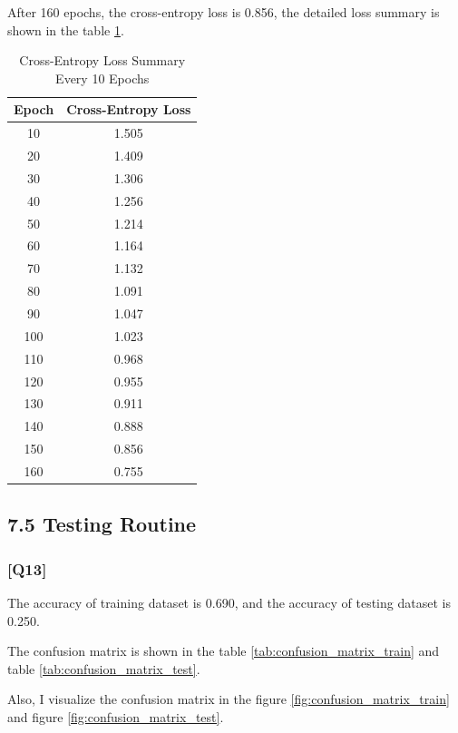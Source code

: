 \documentclass{article}
\begin{document}
After 160 epochs, the cross-entropy loss is 0.856, the detailed loss summary is shown in the table \ref{tab:cross_entropy_loss}.
\begin{table}[ht]
    \centering
    \caption{Cross-Entropy Loss Summary Every 10 Epochs}
    \begin{tabular}{cc}
    \toprule
    Epoch & Cross-Entropy Loss \\
    \midrule
    10  & 1.505 \\
    20  & 1.409 \\
    30  & 1.306 \\
    40  & 1.256 \\
    50  & 1.214 \\
    60  & 1.164 \\
    70  & 1.132 \\
    80  & 1.091 \\
    90  & 1.047 \\
    100 & 1.023 \\
    110 & 0.968 \\
    120 & 0.955 \\
    130 & 0.911 \\
    140 & 0.888 \\
    150 & 0.856 \\
    160 & 0.755 \\
    \bottomrule
    \end{tabular}
    \label{tab:cross_entropy_loss}
\end{table}


\subsection*{7.5 Testing Routine}

\subsubsection*{[Q13]}

The accuracy of training dataset is 0.690, and the accuracy of testing dataset is 0.250.

The confusion matrix is shown in the table \ref{tab:confusion_matrix_train} and table \ref{tab:confusion_matrix_test}.

Also, I visualize the confusion matrix in the figure \ref{fig:confusion_matrix_train} and figure \ref{fig:confusion_matrix_test}.
\end{document}
